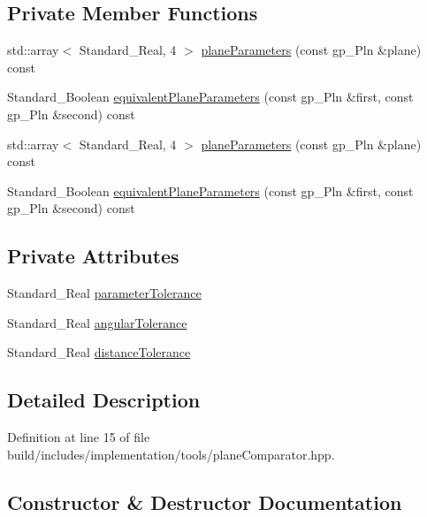 \subsection*{Private Member Functions}
\begin{DoxyCompactItemize}
\item 
std\+::array$<$ Standard\+\_\+\+Real, 4 $>$ \hyperlink{classMcCAD_1_1Tools_1_1PlaneComparator_a1b61d399885072e2af2e3cd03d1ca6c3}{plane\+Parameters} (const gp\+\_\+\+Pln \&plane) const
\item 
Standard\+\_\+\+Boolean \hyperlink{classMcCAD_1_1Tools_1_1PlaneComparator_a6b3939e79155c791bdc5da4dc7d3b980}{equivalent\+Plane\+Parameters} (const gp\+\_\+\+Pln \&first, const gp\+\_\+\+Pln \&second) const
\item 
std\+::array$<$ Standard\+\_\+\+Real, 4 $>$ \hyperlink{classMcCAD_1_1Tools_1_1PlaneComparator_a67ad4238f5b52bdd3734710bcd43014c}{plane\+Parameters} (const gp\+\_\+\+Pln \&plane) const
\item 
Standard\+\_\+\+Boolean \hyperlink{classMcCAD_1_1Tools_1_1PlaneComparator_a6b3939e79155c791bdc5da4dc7d3b980}{equivalent\+Plane\+Parameters} (const gp\+\_\+\+Pln \&first, const gp\+\_\+\+Pln \&second) const
\end{DoxyCompactItemize}
\subsection*{Private Attributes}
\begin{DoxyCompactItemize}
\item 
Standard\+\_\+\+Real \hyperlink{classMcCAD_1_1Tools_1_1PlaneComparator_adef35ba390ab77e8e03eadec54a87d5d}{parameter\+Tolerance}
\item 
Standard\+\_\+\+Real \hyperlink{classMcCAD_1_1Tools_1_1PlaneComparator_a7a12aa43a017dfa6242fc51d87310232}{angular\+Tolerance}
\item 
Standard\+\_\+\+Real \hyperlink{classMcCAD_1_1Tools_1_1PlaneComparator_a6e41cff0b95b5a5aa18de33ee9925e04}{distance\+Tolerance}
\end{DoxyCompactItemize}


\subsection{Detailed Description}


Definition at line 15 of file build/includes/implementation/tools/plane\+Comparator.\+hpp.



\subsection{Constructor \& Destructor Documentation}
\mbox{\label{classMcCAD_1_1Tools_1_1PlaneComparator_a01aad597a147022419ddbb4625c6370d}} 
